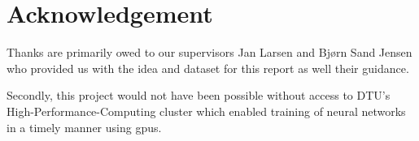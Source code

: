 \section{Acknowledgement}
Thanks are primarily owed to our supervisors Jan Larsen and Bjørn Sand Jensen who provided us with the idea and dataset for this report as well their guidance.

Secondly, this project would not have been possible without access to DTU's High-Performance-Computing cluster which enabled training of neural networks in a timely manner using gpus.
